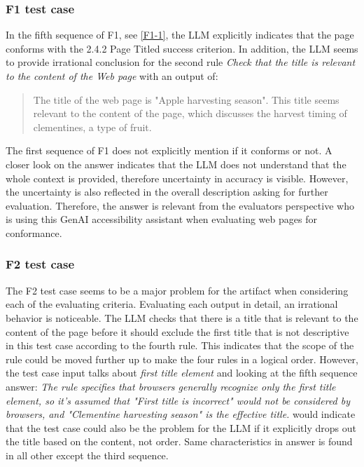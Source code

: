 \subsubsection{F1 test case}

In the fifth sequence of F1, see \ref{F1-1}, the LLM explicitly indicates that the page conforms with the 2.4.2 Page Titled success criterion. In addition, the LLM seems to provide irrational conclusion for the second rule \textit{Check that the title is relevant to the content of the Web page} with an output of:

\begin{quote}
    The title of the web page is "Apple harvesting season". This title seems relevant to the content of the page, which discusses the harvest timing of clementines, a type of fruit.
\end{quote}

The first sequence of F1 does not explicitly mention if it conforms or not. A closer look on the answer indicates that the LLM does not understand that the whole context is provided, therefore uncertainty in accuracy is visible. However, the uncertainty is also reflected in the overall description asking for further evaluation. Therefore, the answer is relevant from the evaluators perspective who is using this GenAI accessibility assistant when evaluating web pages for conformance.

\subsubsection{F2 test case}

The F2 test case seems to be a major problem for the artifact when considering each of the evaluating criteria. Evaluating each output in detail, an irrational behavior is noticeable. The LLM checks that there is a title that is relevant to the content of the page before it should exclude the first title that is not descriptive in this test case according to the fourth rule. This indicates that the scope of the rule could be moved further up to make the four rules in a logical order. However, the test case input talks about \textit{first title element} and looking at the fifth sequence answer: \textit{The rule specifies that browsers generally recognize only the first title element, so it's assumed that "First title is incorrect" would not be considered by browsers, and "Clementine harvesting season" is the effective title.} would indicate that the test case could also be the problem for the LLM if it explicitly drops out the title based on the content, not order. Same characteristics in answer is found in all other except the third sequence.

